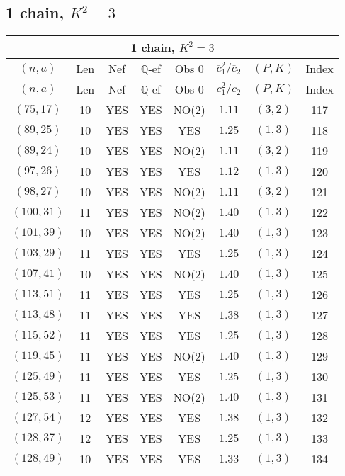\subsection{1 chain, $K^2 = 3$}
\begin{longtable}{|c|c|c|c|c|c|c|c|}
\hline
\multicolumn{8}{|c|}{1 chain, $K^2 = 3$}\\
\hline
$(n,a)$ & Len & Nef & $\mathbb Q$-ef & Obs 0 & $\overline c_1^2 / \overline c_2$ & $(P,K)$ & Index\\
\hline
\endfirsthead

\hline
$(n,a)$ & Len & Nef & $\mathbb Q$-ef & Obs 0 & $\overline c_1^2 / \overline c_2$ & $(P,K)$ & Index\\
\hline
\endhead
\hline
\endfoot

$(75,17)$ & 10 & YES & YES & NO(2) & $1.11$ & $(3,2)$ & 117\\
$(89,25)$ & 10 & YES & YES & YES & $1.25$ & $(1,3)$ & 118\\
$(89,24)$ & 10 & YES & YES & NO(2) & $1.11$ & $(3,2)$ & 119\\
$(97,26)$ & 10 & YES & YES & YES & $1.12$ & $(1,3)$ & 120\\
$(98,27)$ & 10 & YES & YES & NO(2) & $1.11$ & $(3,2)$ & 121\\
$(100,31)$ & 11 & YES & YES & NO(2) & $1.40$ & $(1,3)$ & 122\\
$(101,39)$ & 10 & YES & YES & NO(2) & $1.40$ & $(1,3)$ & 123\\
$(103,29)$ & 11 & YES & YES & YES & $1.25$ & $(1,3)$ & 124\\
$(107,41)$ & 10 & YES & YES & NO(2) & $1.40$ & $(1,3)$ & 125\\
$(113,51)$ & 11 & YES & YES & YES & $1.25$ & $(1,3)$ & 126\\
$(113,48)$ & 11 & YES & YES & YES & $1.38$ & $(1,3)$ & 127\\
$(115,52)$ & 11 & YES & YES & YES & $1.25$ & $(1,3)$ & 128\\
$(119,45)$ & 11 & YES & YES & NO(2) & $1.40$ & $(1,3)$ & 129\\
$(125,49)$ & 11 & YES & YES & YES & $1.25$ & $(1,3)$ & 130\\
$(125,53)$ & 11 & YES & YES & NO(2) & $1.40$ & $(1,3)$ & 131\\
$(127,54)$ & 12 & YES & YES & YES & $1.38$ & $(1,3)$ & 132\\
$(128,37)$ & 12 & YES & YES & YES & $1.25$ & $(1,3)$ & 133\\
$(128,49)$ & 10 & YES & YES & YES & $1.33$ & $(1,3)$ & 134\\

\end{longtable}
